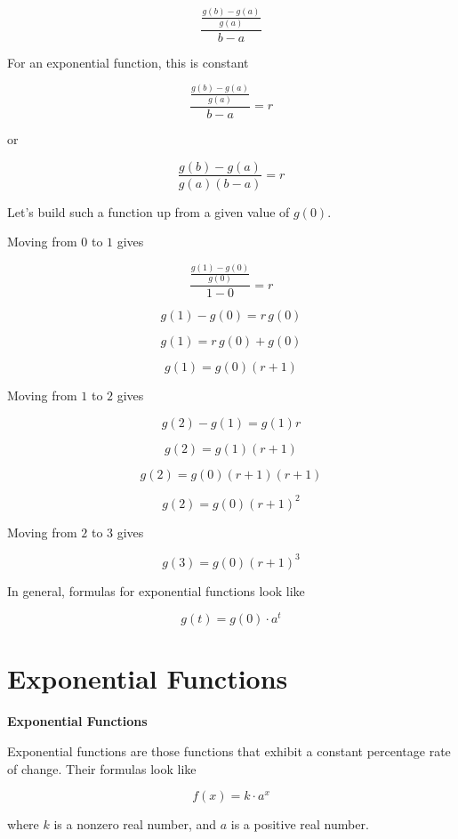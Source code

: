 \documentclass{ximera}
\begin{document}
\[      \frac{\frac{g(b)-g(a)}{g(a)}}{b-a}    \]



For an exponential function, this is constant


\[      \frac{\frac{g(b)-g(a)}{g(a)}}{b-a}  = r  \]

or

\[      \frac{g(b)-g(a)}{g(a)(b-a)}  = r  \]



Let's build such a function up from a given value of $g(0)$. 


\begin{procedure}
Moving from $0$ to $1$ gives

\[      \frac{\frac{g(1)-g(0)}{g(0)}}{1-0}  = r  \]


\[      g(1)-g(0) = r \, g(0)  \]


\[      g(1) = r \, g(0) + g(0)  \]

\[      g(1) =  g(0) (r + 1)  \]



Moving from $1$ to $2$ gives

\[      g(2) - g(1) =  g(1) r  \]

\[      g(2) =  g(1) (r + 1)  \]

\[      g(2) =  g(0) (r + 1) (r + 1)  \]

\[      g(2) =  g(0) (r + 1)^2  \]




Moving from $2$ to $3$ gives

\[      g(3) =  g(0) (r + 1)^3  \]

\end{procedure}


In general, formulas for exponential functions look like


\[      g(t) = g(0) \cdot a^t   \]

















\section{Exponential Functions}


\begin{definition} \textbf{\textcolor{green!50!black}{Exponential Functions}}

Exponential functions are those functions that exhibit a constant percentage rate of change.  Their formulas look like


\[      f(x) = k \cdot a^x   \]

where $k$ is a nonzero real number, and $a$ is a positive real number.


\end{definition}
\end{document}
